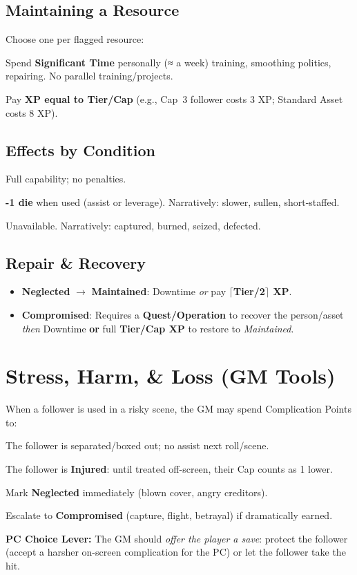 \documentclass[12pt]{article}
\begin{document}
\subsection{Maintaining a Resource}
Choose one per flagged resource:
\begin{description}[leftmargin=3.2cm]
  \item[Downtime] Spend \textbf{Significant Time} personally (≈ a week) training, smoothing politics, repairing. No parallel training/projects.
  \item[XP Injection] Pay \textbf{XP equal to Tier/Cap} (e.g., Cap~3 follower costs 3 XP; Standard Asset costs 8 XP).
\end{description}

\subsection{Effects by Condition}
\begin{description}[leftmargin=3.2cm]
  \item[Maintained] Full capability; no penalties.
  \item[Neglected] \textbf{-1 die} when used (assist or leverage). Narratively: slower, sullen, short-staffed.
  \item[Compromised] Unavailable. Narratively: captured, burned, seized, defected.
\end{description}

\subsection{Repair \& Recovery}
\begin{itemize}
  \item \textbf{Neglected} $\rightarrow$ \textbf{Maintained}: Downtime \emph{or} pay \textbf{$\lceil$Tier/2$\rceil$ XP}.
  \item \textbf{Compromised}: Requires a \textbf{Quest/Operation} to recover the person/asset \emph{then} Downtime \textbf{or} full \textbf{Tier/Cap XP} to restore to \textit{Maintained}.
\end{itemize}

\section{Stress, Harm, \& Loss (GM Tools)}
When a follower is used in a risky scene, the GM may spend Complication Points to:
\begin{description}[leftmargin=3.2cm]
  \item[Pin] The follower is separated/boxed out; no assist next roll/scene.
  \item[Wound] The follower is \textbf{Injured}: until treated off-screen, their Cap counts as 1 lower.
  \item[Burn] Mark \textbf{Neglected} immediately (blown cover, angry creditors).
  \item[Seize] Escalate to \textbf{Compromised} (capture, flight, betrayal) if dramatically earned.
\end{description}
\textbf{PC Choice Lever:} The GM should \emph{offer the player a save}: protect the follower (accept a harsher on-screen complication for the PC) or let the follower take the hit.
\end{document}
